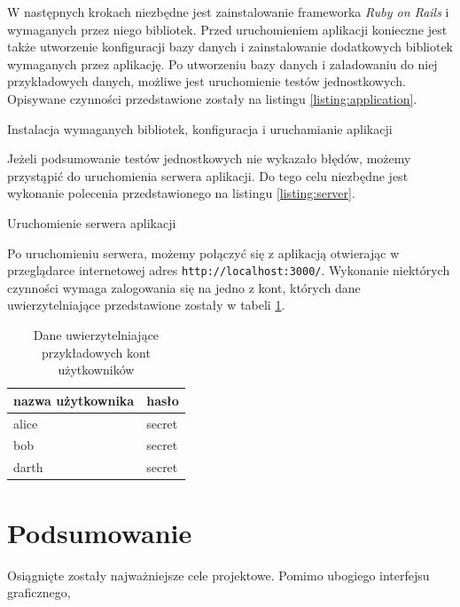 \documentclass[11pt,twoside]{report}
\begin{document}
W następnych krokach niezbędne jest zainstalowanie frameworka
\emph{Ruby on Rails} i wymaganych przez niego bibliotek. Przed
uruchomieniem aplikacji konieczne jest także utworzenie konfiguracji
bazy danych i zainstalowanie dodatkowych bibliotek wymaganych przez
aplikację. Po utworzeniu bazy danych i załadowaniu do niej
przykładowych danych, możliwe jest uruchomienie testów
jednostkowych. Opisywane czynności przedstawione zostały na listingu
\ref{listing:application}.

\begin{listing}
  
  \caption{Instalacja wymaganych bibliotek, konfiguracja i
    uruchamianie aplikacji}
  \label{listing:application}
\end{listing}

Jeżeli podsumowanie testów jednostkowych nie wykazało błędów, możemy
przystąpić do uruchomienia serwera aplikacji. Do tego celu niezbędne
jest wykonanie polecenia przedstawionego na listingu
\ref{listing:server}.

\begin{listing}
  
  \caption{Uruchomienie serwera aplikacji}
  \label{listing:server}
\end{listing}

Po uruchomieniu serwera, możemy połączyć się z aplikacją otwierając w
przeglądarce internetowej adres
\texttt{http://localhost:3000/}. Wykonanie niektórych czynności wymaga
zalogowania się na jedno z kont, których dane uwierzytelniające
przedstawione zostały w tabeli \ref{table:credentials}.

\begin{table}[ht]
  \begin{center}
    \begin{tabular}[center]{|l|l|}
      \hline
      \textbf{nazwa użytkownika} & \textbf{hasło} \\
      \hline
      alice & secret \\
      bob & secret \\
      darth & secret \\
      \hline
    \end{tabular}
  \end{center}
  \label{table:credentials}
  \caption{Dane uwierzytelniające przykładowych kont użytkowników}
\end{table}

\cleardoublepage

\chapter{Podsumowanie}
Osiągnięte zostały najważniejsze cele projektowe. Pomimo ubogiego
interfejsu graficznego,



\clearpage



\end{document}

